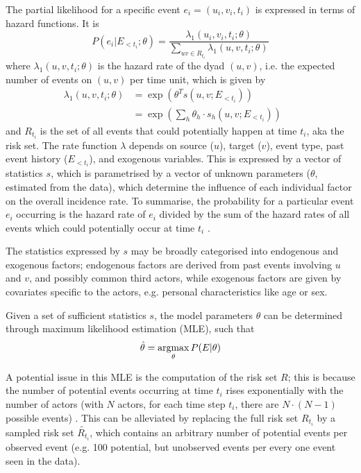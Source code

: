 The partial likelihood for a specific event $e_i = (u_i,v_i,t_i)$ is expressed in terms of hazard functions. It is
\begin{equation*}
	P(e_i|E_{<t_i};\theta) = \frac{\lambda_1(u_i,v_i,t_i;\theta)}{\sum_{uv\in R_{t_i}}\lambda_1(u,v,t_i;\theta)}
\end{equation*}
where $\lambda_1(u,v,t_i;\theta)$ is the hazard rate of the dyad $(u,v)$, i.e. the expected number of events on $(u,v)$ per time unit, which is given by
\begin{align*}
	\lambda_1(u,v,t_i;\theta) &= \exp(\theta^T s(u,v;E_{<t_i}))\\
	&= \exp(\sum_h \theta_h \cdot s_h(u,v;E_{<t_i}))&&
\end{align*}
and $R_{t_i}$ is the set of all events that could potentially happen at time $t_i$, aka the risk set. The rate function $\lambda$ depends on source ($u$), target ($v$), event type, past event history ($E_{<t_i}$), and exogenous variables. This is expressed by a vector of statistics $s$, which is parametrised by a vector of unknown parameters ($\theta$, estimated from the data), which determine the influence of each individual factor on the overall incidence rate. To summarise, the probability for a particular event $e_i$ occurring is the hazard rate of $e_i$ divided by the sum of the hazard rates of all events which could potentially occur at time $t_i$ \cite{butts20084}.

The statistics expressed by $s$ may be broadly categorised into endogenous and exogenous factors; endogenous factors are derived from past events involving $u$ and $v$, and possibly common third actors, while exogenous factors are given by covariates specific to the actors, e.g. personal characteristics like age or sex. 

Given a set of sufficient statistics $s$, the model parameters $\theta$ can be determined through maximum likelihood estimation (MLE), such that \[\hat{\theta} = \operatorname*{argmax}_{\theta} P(E|\theta)\]

A potential issue in this MLE is the computation of the risk set $R$; this is because the number of potential events occurring at time $t_i$ rises exponentially with the number of actors (with $N$ actors, for each time step $t_i$, there are $N \cdot (N - 1)$ possible events) \cite{butts20084}. This can be alleviated by replacing the full risk set $R_{t_i}$ by a sampled risk set $\tilde{R_{t_i}}$, which contains an arbitrary number of potential events per observed event (e.g. 100 potential, but unobserved events per every one event seen in the data).

